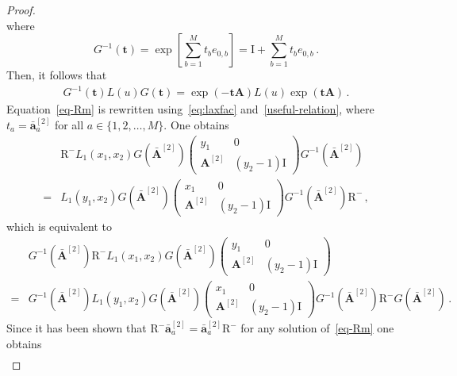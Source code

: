 \documentclass[11pt]{article}
\numberwithin{equation}{section}
\newcommand{\oad}{\mathbf{\bar{a}}}
\newcommand{\OA}{\mathbf{A}}
\newcommand{\OAD}{\mathbf{\bar{A}}}
\newcommand{\M}{M}
\newcommand{\ID}{\mathrm{I}}
\newcommand{\abrOSCR}{\mathrm{R}}
\begin{document}
\begin{proof}
\begin{equation}
\end{equation}
where
\begin{equation}
	G^{-1}(\mathbf{t})=\exp{\left[\sum_{b=1}^{\M}t_{b}e_{0,b}\right]}=\ID+\sum_{b=1}^{\M}t_{b}e_{0,b}
	 \,.
\end{equation}
Then, it follows that
\begin{align}\label{useful-relation}
	G^{-1}(\mathbf{t})L(u)G(\mathbf{t})=\exp{\left(-\mathbf{t}\OA\right)} L(u)\exp{\left(\mathbf{t}\OA\right)}\,.
\end{align}
Equation~\eqref{eq-Rm} is rewritten using~\eqref{eq:laxfac} and~\eqref{useful-relation}, where $t_{a}={\oad}_{a}^{[2]}$ for all $a\in \{1,2,\ldots,\M\}$. One obtains
\begin{equation}
	\begin{split}
		&\abrOSCR^{-}L_{1}(x_{1},x_{2})G(\OAD^{[2]})\left(\begin{array}{cc}
			y_{1}&0\\
			\OA^{[2]}&(y_{2}-1)\ID
		\end{array}\right)G^{-1}(\OAD^{[2]})
		\\=&
		L_{1}(y_{1},x_{2})G(\OAD^{[2]})\left(\begin{array}{cc}
			x_1&0\\
			\OA^{[2]}&(y_{2}-1)\ID
		\end{array}\right)G^{-1}(\OAD^{[2]})\abrOSCR^{-}\,,
	\end{split}
\end{equation}
which is equivalent to
\begin{equation}
	\begin{split}
		&G^{-1}(\OAD^{[2]})\abrOSCR^{-}L_{1}(x_{1},x_{2})G(\OAD^{[2]})\left(\begin{array}{cc}
			y_{1}&0\\
			\OA^{[2]}&(y_{2}-1)\ID
		\end{array}\right)
		\\=&
		G^{-1}(\OAD^{[2]})L_{1}(y_{1},x_{2})G(\OAD^{[2]})\left(\begin{array}{cc}
			x_1&0\\
			\OA^{[2]}&(y_{2}-1)\ID
		\end{array}\right)G^{-1}(\OAD^{[2]})\abrOSCR^{-}G(\OAD^{[2]})\,.
	\end{split}
\end{equation}
Since it has been shown that $\abrOSCR^{-}{\oad}_{a}^{[2]}={\oad}_{a}^{[2]}\abrOSCR^{-}$  for any solution of~\eqref{eq-Rm} one obtains
\begin{equation}
	\begin{split}

\end{split}
\end{equation}
\end{proof}
\end{document}
